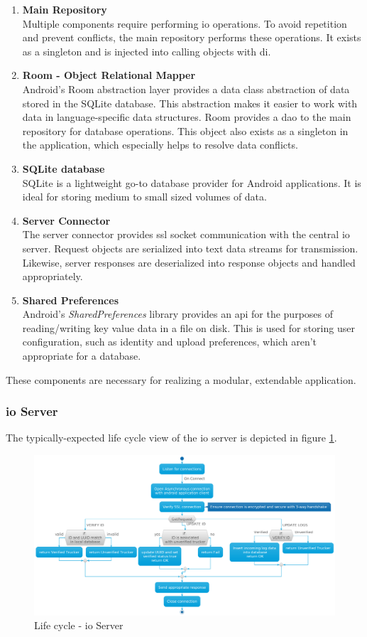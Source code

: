 \begin{enumerate}
\item \textbf{Main Repository}\\
Multiple components require performing \ac{io} operations.
To avoid repetition and prevent conflicts, the main repository performs these operations.
It exists as a singleton and is injected into calling objects with \ac{di}.
\item \textbf{Room - Object Relational Mapper}\\
Android's Room abstraction layer provides a data class abstraction of data stored in the SQLite database.
This abstraction makes it easier to work with data in language-specific data structures.
Room provides a \ac{dao} to the main repository for database operations.
This object also exists as a singleton in the application, which especially helps to resolve data conflicts.
\item \textbf{SQLite database}\\
SQLite is a lightweight go-to database provider for Android applications.
It is ideal for storing medium to small sized volumes of data.
\item \textbf{Server Connector}\\
The server connector provides \ac{ssl} socket communication with the central \ac{io} server.
Request objects are serialized into text data streams for transmission.
Likewise, server responses are deserialized into response objects and handled appropriately.
\item \textbf{Shared Preferences}\\
Android's \textit{SharedPreferences} library provides an \ac{api} for the purposes of reading/writing key value data in a file on disk.
This is used for storing user configuration, such as identity and upload preferences, which aren't appropriate for a database.
\end{enumerate}

These components are necessary for realizing a modular, extendable application.

\pagebreak
\subsubsection{\Ac{io} Server}
The typically-expected life cycle view of the \ac{io} server is depicted in figure \ref{fig:IO_activity}.

\begin{figure}[H]
\centering
\includegraphics[width=6in]{../diag/IO_activity.png}
\caption{Life cycle - \Ac{io} Server}
\label{fig:IO_activity}
\end{figure}

